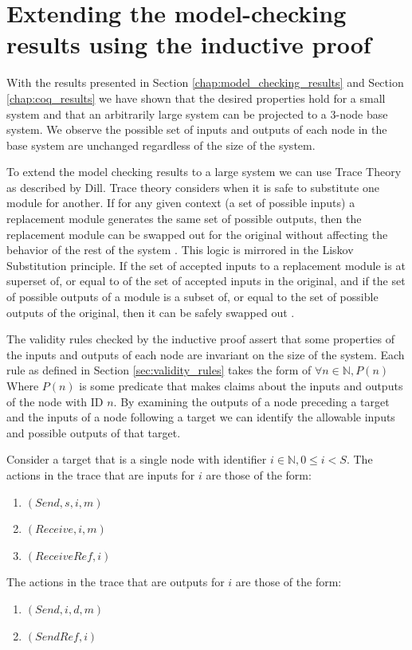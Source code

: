 \documentclass[runningheads]{llncs}
\begin{document}
\section{Extending the model-checking results using the inductive proof}
With the results presented in Section \ref{chap:model_checking_results} and Section \ref{chap:coq_results} we have shown that the desired properties hold for a small system and that an arbitrarily large system can be projected to a 3-node base system. We observe the possible set of inputs and outputs of each node in the base system are unchanged regardless of the size of the system. 

To extend the model checking results to a large system we can use Trace Theory as described by Dill. Trace theory considers when it is safe to substitute one module for another. If for any given context (a set of possible inputs) a replacement module generates the same set of possible outputs, then the replacement module can be swapped out for the original without affecting the behavior of the rest of the system \cite{dill_trace_theory}. This logic is mirrored in the Liskov Substitution principle. If the set of accepted inputs to a replacement module is at superset of, or equal to of the set of accepted inputs in the original, and if the set of possible outputs of a module is a subset of, or equal to the set of possible outputs of the original, then it can be safely swapped out \cite{liskov_substitution}. 

The validity rules checked by the inductive proof assert that some properties of the inputs and outputs of each node are invariant on the size of the system. Each rule as defined in Section \ref{sec:validity_rules} takes the form of $ \forall n \in \mathds{N}, P(n)$ Where $P(n)$ is some predicate that makes claims about the inputs and outputs of the node with ID $n$. By examining the outputs of a node preceding a target and the inputs of a node following a target we can identify the allowable inputs and possible outputs of that target.

Consider a target that is a single node with identifier $i \in \mathds{N}, 0 \le i < S$. The actions in the trace that are inputs for $i$ are those of the form:
\begin{enumerate}
    \item  $(Send, s, i, m)$
    \item  $(Receive, i, m)$
    \item  $(ReceiveRef, i)$
\end{enumerate}
The actions in the trace that are outputs for $i$ are those of the form:
\begin{enumerate}
    \item  $(Send, i, d, m)$
    \item  $(SendRef, i)$
\end{enumerate}
\end{document}
